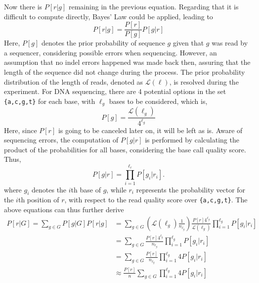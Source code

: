 \documentclass{PHlab-thesis}
\begin{document}
Now there is $P[r|g]$ remaining in the previous equation. Regarding that it is difficult to compute directly, Bayes' Law could be applied, leading to
\begin{equation}
P[r|g] = \frac{P[r]}{P[g]} P[g|r]
\end{equation}
Here, $P[g]$ denotes the prior probability of sequence $g$ given that $g$ was read by a sequencer, considering possible errors when sequencing. However, an assumption that no indel errors happened was made back then, assuring that the length of the sequence did not change during the process. The prior probability distribution of the length of reads, denoted as $\mathcal{L}(\ell)$, is resolved during the experiment. For DNA sequencing, there are 4 potential options in the set \texttt{\{a,c,g,t\}} for each base, with $\ell_g$ bases to be considered, which is,
\begin{equation}
P[g] =  \frac{\mathcal{L}(\ell_g)}{4^{\ell_g}}
\end{equation}
Here, since $P[r]$ is going to be canceled later on, it will be left as is. Aware of sequencing errors, the computation of $P[g|r]$ is performed by calculating the product of the probabilities for all bases, considering the base call quality score. Thus,
\begin{equation}
P[g|r] = \prod_{i=1}^{\ell_r} P[g_i|r_i].
\end{equation}
where $g_i$ denotes the $i$th base of $g$, while $r_i$ represents the probability vector for the $i$th position of $r$, with respect to the read quality score over \texttt{\{a,c,g,t\}}. The above equations can thus further derive
\begin{equation*}
\begin{split}
P[r|G] =  \sum_{g\in G} P[g|G] P[r|g] &= \sum_{g\in G} \left( \mathcal{L}(\ell_g) \frac{1}{n_{\ell_g}} \right) \frac{P[r]4^{\ell_g}}{\mathcal{L}(\ell_g)} \prod_{i=1}^{\ell_g} P[g_i|r_i]  \\
                                      &= \sum_{g\in G} \frac{P[r]4^{\ell_g}}{n_{\ell_g}} \prod_{i=1}^{\ell_g} P[g_i|r_i]  \\
                                      &= \sum_{g\in G} \frac{P[r]}{n_{\ell_g}} \prod_{i=1}^{\ell_g} 4P[g_i|r_i]  \\
                                      &\approx \frac{P[r]}{n} \sum_{g\in G} \prod_{i=1}^{\ell_g} 4P[g_i|r_i]  \\
\end{split}
\end{equation*}
\end{document}
